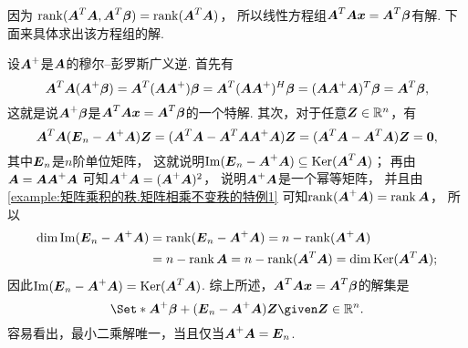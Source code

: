 因为 \hyperref[example:线性方程组有解的充分必要条件.最小二乘解的存在性]{$\rank(\vb{A}^T \vb{A}, \vb{A}^T \vb\beta) = \rank(\vb{A}^T \vb{A})$}，
所以线性方程组\(\vb{A}^T \vb{A} \vb{x} = \vb{A}^T \vb\beta\)有解.
下面来具体求出该方程组的解.

\begingroup  %
设\(\vb{A}^+\)是\(\vb{A}\)的穆尔--彭罗斯广义逆.
首先有\begin{equation*}
	\vb{A}^T \vb{A} (\vb{A}^+ \vb\beta)
	= \vb{A}^T (\vb{A} \vb{A}^+) \vb\beta
	= \vb{A}^T (\vb{A} \vb{A}^+)^H \vb\beta
	= (\vb{A} \vb{A}^+ \vb{A})^T \vb\beta
	= \vb{A}^T \vb\beta,
\end{equation*}
这就是说\(\vb{A}^+ \vb\beta\)是\(\vb{A}^T \vb{A} \vb{x} = \vb{A}^T \vb\beta\)的一个特解.
其次，对于任意\(\vb{Z} \in \mathbb{R}^n\)，有\begin{equation*}
	\vb{A}^T \vb{A} (\vb{E}_n - \vb{A}^+ \vb{A}) \vb{Z}
	= (\vb{A}^T \vb{A} - \vb{A}^T \vb{A} \vb{A}^+ \vb{A}) \vb{Z}
	= (\vb{A}^T \vb{A} - \vb{A}^T \vb{A}) \vb{Z}
	= \vb0,
\end{equation*}
其中\(\vb{E}_n\)是\(n\)阶单位矩阵，
这就说明\(
	\Im(\vb{E}_n - \vb{A}^+ \vb{A})
	\subseteq
	\Ker(\vb{A}^T \vb{A})
\)；
再由\(\vb{A} = \vb{A} \vb{A}^+ \vb{A}\)
可知\(
	\vb{A}^+ \vb{A}
	= (\vb{A}^+ \vb{A})^2
\)，
说明\(\vb{A}^+ \vb{A}\)是一个幂等矩阵，
并且由\cref{example:矩阵乘积的秩.矩阵相乘不变秩的特例1} 可知\(\rank(\vb{A}^+ \vb{A}) = \rank\vb{A}\)，
所以\begin{align*}
	\dim\Im(\vb{E}_n - \vb{A}^+ \vb{A})
	&= \rank(\vb{E}_n - \vb{A}^+ \vb{A})
	= n - \rank(\vb{A}^+ \vb{A}) \\
	&= n - \rank\vb{A}
	= n - \rank(\vb{A}^T \vb{A})
	= \dim\Ker(\vb{A}^T \vb{A});
\end{align*}
因此\(
	\Im(\vb{E}_n - \vb{A}^+ \vb{A})
	= \Ker(\vb{A}^T \vb{A})
\).
综上所述，\(\vb{A}^T \vb{A} \vb{x} = \vb{A}^T \vb\beta\)的解集是\begin{equation*}
	\Set*{
		\vb{A}^+ \vb\beta
		+ (\vb{E}_n - \vb{A}^+ \vb{A}) \vb{Z}
		\given
		\vb{Z} \in \mathbb{R}^n
	}.
\end{equation*}
\endgroup
容易看出，最小二乘解唯一，当且仅当\(\vb{A}^+ \vb{A} = \vb{E}_n\).


